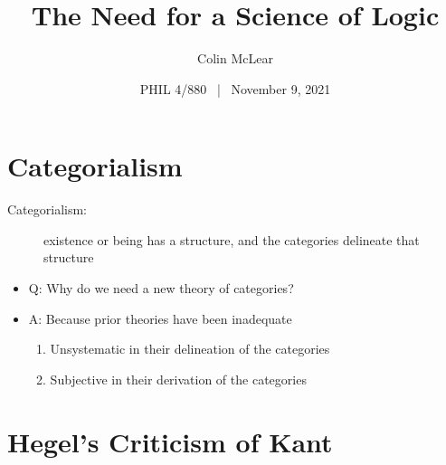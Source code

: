 \documentclass[12pt]{article}
\author{Colin McLear}
\date{PHIL 4/880~ |~ November 9, 2021}
\title{The Need for a Science of Logic}
\begin{document}
\makeatletter
\newcommand{\citeprocitem}[2]{\hyper@linkstart{cite}{citeproc_bib_item_#1}#2\hyper@linkend}
\makeatother



\maketitle


\section{Categorialism}
\label{sec:org835fede}

\begin{description}
\item[{Categorialism:}] existence or being has a structure, and the categories
delineate that structure
\end{description}


\begin{itemize}
\item Q: Why do we need a new theory of categories?
\item A: Because prior theories have been inadequate
\begin{enumerate}
\item Unsystematic in their delineation of the categories
\item Subjective in their derivation of the categories
\end{enumerate}
\end{itemize}


\section{Hegel's Criticism of Kant}
\label{sec:orgc1bbb24}
\end{document}
